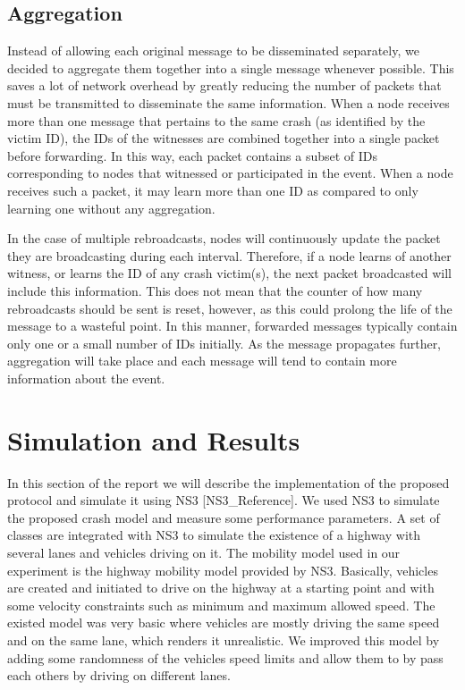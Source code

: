 \documentclass{IEEEtran}
\begin{document}
\subsection{Aggregation}

Instead of allowing each original message to be disseminated separately, we decided to aggregate them together into a single message whenever possible.
This saves a lot of network overhead by greatly reducing the number of packets that must be transmitted to disseminate the same information.
When a node receives more than one message that pertains to the same crash (as identified by the victim ID), the IDs of the witnesses are combined together into a single packet before forwarding.
In this way, each packet contains a subset of IDs corresponding to nodes that witnessed or participated in the event.
When a node receives such a packet, it may learn more than one ID as compared to only learning one without any aggregation.

In the case of multiple rebroadcasts, nodes will continuously update the packet they are broadcasting during each interval.
Therefore, if a node learns of another witness, or learns the ID of any crash victim(s), the next packet broadcasted will include this information.
This does not mean that the counter of how many rebroadcasts should be sent is reset, however, as this could prolong the life of the message to a wasteful point.
In this manner, forwarded messages typically contain only one or a small number of IDs initially.
As the message propagates further, aggregation will take place and each message will tend to contain more information about the event.


\section{Simulation and Results}
In this section of the report we will describe the implementation of the proposed protocol and simulate it using NS3 [NS3\_Reference]. We used NS3 to simulate the proposed crash model and measure some performance parameters. A set of classes are integrated with NS3 to simulate the existence of a highway with several lanes and vehicles driving on it. The mobility model used in our experiment is the highway mobility model provided by NS3. Basically, vehicles are created and initiated to drive on the highway at a starting point and with some velocity constraints such as minimum and maximum allowed speed. The existed model was very basic where vehicles are mostly driving the same speed and on the same lane, which renders it unrealistic. We improved this model by adding some randomness of the vehicles speed limits and allow them to by pass each others by driving on different lanes.
\end{document}
